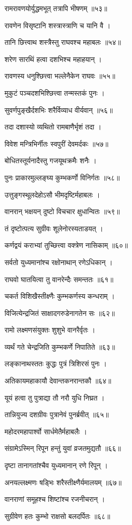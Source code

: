 रामरावणयोर्युद्धमभूत् तत्रापि भीषणम् ॥५३॥

रावणेन विसृष्टानि शस्त्रास्त्राणि च यानि वै ।

तानि छित्त्वाथ शस्त्रैस्तु राघवश्च महाबलः ॥५४॥

शरेण सारथिं हत्वा दशभिश्च महाहयान् ।

रावणस्य धनुश्छित्त्वा भल्लेनैकेन राघवः ॥५५॥

मुकुटं पञ्चदशभिश्छित्त्वा तन्मस्तकं पुनः ।

सुवर्णपुङ्खैर्दशभिः शरैर्विव्याध वीर्यवान् ॥५६॥

तदा दशास्यो व्यथितो रामबाणैर्भृशं तदा ।

विवेश मन्त्रिभिर्नीतः स्वपुरीं देवमर्दकः ॥५७॥

बोधितस्तूर्यनादैस्तु गजयूथक्रमैः शनैः ।

पुनः प्राकारमुल्लङ्घ्य कुम्भकर्णो विनिर्गतः ॥५८॥

उत्तुङ्गस्थूलदेहोऽसौ भीमदृष्टिर्महाबलः ।

वानरान् भक्षयन् दुष्टो विचचार क्षुधान्वितः ॥५९॥

तं दृष्टोत्पत्य सुग्रीवः शूलेनोरस्यताडयत् ।

कर्णद्वयं कराभ्यां तुच्छित्त्वा वक्त्रेण नासिकाम् ॥६०॥

सर्वतो युध्यमानांश्च रक्षोनाथान् रणेऽधिकान् ।

राघवो घातयित्वा तु वानरेन्दैः समन्ततः ॥६१॥

चकर्त विशिखैस्तीक्ष्णैः कुम्भकर्णस्य कन्धराम् ।

विजित्येन्द्रजितं साक्षादगरुडेनागतेन सः ॥६२॥

रामो लक्ष्मणसंयुक्तः शुशुभे वानरैर्वृतः ।

व्यर्थं गते चेन्द्रजिति कुम्भकर्णे निपातिते ॥६३॥

लङ्कानाथस्ततः कुद्धः पुत्रं त्रिशिरसं पुनः ।

अतिकायमहाकायौ देवान्तकनरान्तकौ ॥६४॥

यूयं हत्वा तु पुत्राद्या तौ नरौ युधि निघ्रत ।

तान्नियुज्य दशग्रीवः पुत्रानेवं पुनर्ब्रवीत् ॥६५॥

महोदरमहापार्श्वो सार्धमेतैर्महाबलैः ।

संग्रामेऽस्मिन् रिपून हन्तुं युवां व्रजतमुद्यतौ ॥६६॥

दृष्टा तानागतांश्चैव युध्यमानान् रणे रिपून् ।

अनयल्लक्ष्मणः षड्भिः शरैस्तीक्ष्णैर्यमालयम् ॥६७॥

वानराणां समूहश्च शिष्टांश्च रजनीचरान् ।

सुग्रीवेण हतः कुम्भो राक्षसो बलदर्पितः ॥६८॥

